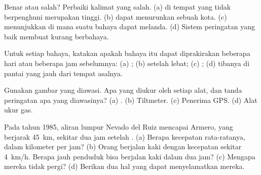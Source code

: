 \begin{exercise}[$\star$]\label{exo:g9:natural-risks:2}
Benar atau salah? Perbaiki kalimat yang salah. (a)  di tempat
yang tidak berpenghuni merupakan  tinggi. (b)  dapat
menurunkan  sebuah kota. (c)  menunjukkan di mana
suatu bahaya dapat melanda. (d) Sistem peringatan yang baik membuat  kurang berbahaya.
\end{exercise}

\begin{exercise}[$\star$]\label{exo:g9:natural-risks:3}
Untuk setiap bahaya, katakan apakah bahaya itu dapat diprakirakan
beberapa hari atau beberapa jam sebelumnya: (a) ; (b)  setelah
 lebat; (c) ; (d) tibanya  di pantai yang jauh dari
tempat asalnya.
\end{exercise}

\begin{exercise}[$\star$]\label{exo:g9:natural-risks:4}
Gunakan gambar  yang diawasi. Apa yang diukur oleh setiap alat,
dan tanda peringatan  apa yang diawasinya? (a) .
(b) Tiltmeter. (c) Penerima GPS. (d) Alat ukur gas.
\end{exercise}

\begin{exercise}[$\star\star$]\label{exo:g9:natural-risks:5}
Pada tahun 1985, aliran lumpur Nevado del Ruiz mencapai Armero, yang
berjarak \qty{45}{km}, sekitar dua jam setelah . (a) Berapa
kecepatan rata-ratanya, dalam kilometer per jam? (b) Orang berjalan kaki
dengan kecepatan sekitar \qty{4}{km/h}. Berapa jauh penduduk bisa
berjalan kaki dalam dua jam? (c) Mengapa mereka tidak pergi? (d) Berikan
dua hal yang dapat menyelamatkan mereka.
\end{exercise}

